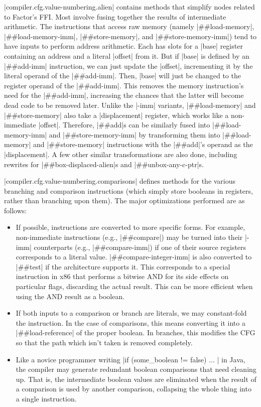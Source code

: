 \factor|compiler.cfg.value-numbering.alien| contains methods that simplify
nodes related to Factor's \gls{FFI}.  Most involve fusing together the results
of intermediate arithmetic.  The instructions that access raw memory (namely
\factor|##load-memory|, \factor|##load-memory-imm|, \factor|##store-memory|,
and \factor|##store-memory-imm|) tend to have inputs to perform address
arithmetic.  Each has slots for a \factor|base| register containing an address
and a literal \factor|offset| from it.  But if \factor|base| is defined by an
\factor|##add-imm| instruction, we can just update the \factor|offset|,
incrementing it by the literal operand of the \factor|##add-imm|.  Then,
\factor|base| will just be changed to the register operand of the
\factor|##add-imm|.  This removes the memory instruction's need for the
\factor|##add-imm|, increasing the chances that the latter will become dead
code to be removed later.  Unlike the \factor|-imm| variants,
\factor|##load-memory| and \factor|##store-memory| also take a
\factor|displacement| register, which works like a non-immediate
\factor|offset|.  Therefore, \factor|##add|s can be similarly fused into
\factor|##load-memory-imm| and \factor|##store-memory-imm| by transforming them
into \factor|##load-memory| and \factor|##store-memory| instructions with the
\factor|##add|'s operand as the \factor|displacement|.  A few other similar
transformations are also done, including rewrites for
\factor|##box-displaced-alien|s and \factor|##unbox-any-c-ptr|s.

\factor|compiler.cfg.value-numbering.comparisons| defines methods for the
various branching and comparison instructions (which simply store booleans in
registers, rather than branching upon them).  The major optimizations performed
are as follows:
%
\begin{itemize}
%
\item If possible, instructions are converted to more specific forms.  For
example, non-immediate instructions (e.g., \factor|##compare|) may be turned
into their \factor|-imm| counterparts (e.g., \factor|##compare-imm|)  if one of
their source registers corresponds to a literal value.
\factor|##compare-integer-imm| is also converted to \factor|##test| if the
architecture supports it.  This corresponds to a special instruction in x86
that performs a bitwise AND for its side effects on particular flags,
discarding the actual result.  This can be more efficient when using the AND
result as a boolean.
%
\item If both inputs to a comparison or branch are literals, we may
constant-fold the instruction.  In the case of comparisons, this means
converting it into a \factor|##load-reference| of the proper boolean.  In
branches, this modifies the \gls{CFG} so that the path which isn't taken is
removed completely.
%
\item Like a novice programmer writing
%
|if (some_boolean != false) { ... }|
%
in Java, the compiler may generate redundant boolean comparisons that need
cleaning up.  That is, the intermediate boolean values are eliminated when the
result of a comparison is used by another comparison, collapsing the whole
thing into a single instruction.
%
\end{itemize}

